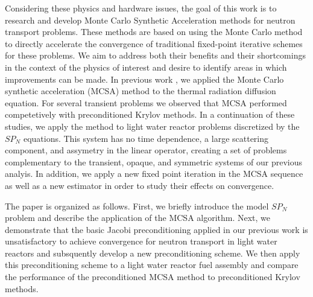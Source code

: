 \documentclass[letterpaper,11pt]{article}
\begin{document}
Considering these physics and hardware issues, the goal of this work
is to research and develop Monte Carlo Synthetic Acceleration methods
for neutron transport problems. These methods are based on using the
Monte Carlo method to directly accelerate the convergence of
traditional fixed-point iterative schemes for these problems. We aim
to address both their benefits and their shortcomings in the context
of the physics of interest and desire to identify areas in which
improvements can be made. In previous work \cite{evans_monte_2012}, we
applied the Monte Carlo synthetic acceleration (MCSA) method to the
thermal radiation diffusion equation. For several transient problems
we observed that MCSA performed competetively with preconditioned
Krylov methods. In a continuation of these studies, we apply the
method to light water reactor problems discretized by the $SP_N$
equations. This system has no time dependence, a large scattering
component, and assymetry in the linear operator, creating a set of
problems complementary to the transient, opaque, and symmetric systems
of our previous analyis. In addition, we apply a new fixed point
iteration in the MCSA sequence as well as a new estimator in order to
study their effects on convergence.

The paper is organized as follows. First, we briefly introduce the
model $SP_N$ problem and describe the application of the MCSA
algorithm. Next, we demonstrate that the basic Jacobi preconditioning
applied in our previous work is unsatisfactory to achieve convergence
for neutron transport in light water reactors and subsquently develop
a new preconditioning scheme. We then apply this preconditioning
scheme to a light water reactor fuel assembly and compare the
performance of the preconditioned MCSA method to preconditioned Krylov
methods.

\end{document}
